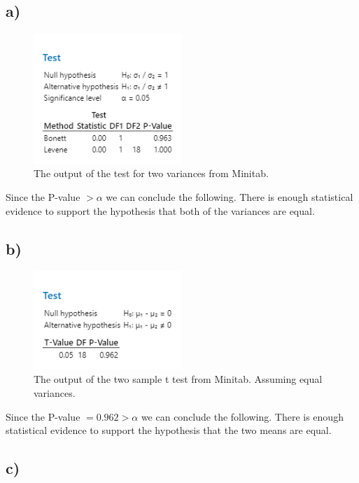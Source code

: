 \documentclass{article}
\begin{document}
\subsection*{a)}
\begin{figure}[h]
    \centering
    \includegraphics[width=0.5\textwidth]{./images/3_a.png}
    \caption{The output of the test for two variances from Minitab.}
    \label{fig:3_a}
  \end{figure}
  Since the P-value $> \alpha$ we can conclude the following.
  There is enough statistical evidence to support the hypothesis that both of the variances are equal.

\subsection*{b)}
\begin{figure}[h]
    \centering
    \includegraphics[width=0.5\textwidth]{./images/3_b.png}
    \caption{The output of the two sample t test from Minitab. Assuming equal variances.}
    \label{fig:3_a}
  \end{figure}
  Since the P-value $= 0.962 > \alpha$ we can conclude the following.
  There is enough statistical evidence to support the hypothesis that the two means are equal.
\subsection*{c)}
\end{document}
